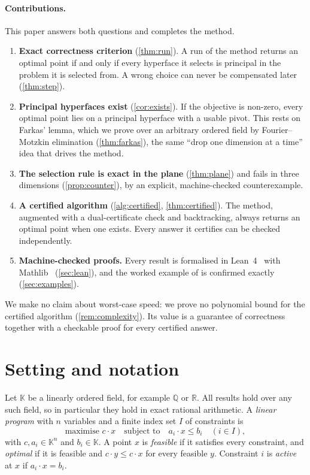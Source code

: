 \documentclass[11pt,a4paper]{article}
\theoremstyle{plain}
\theoremstyle{definition}
\theoremstyle{remark}
\newcommand{\R}{\mathbb{R}}
\newcommand{\K}{\mathbb{K}}
\begin{document}
\paragraph{Contributions.} This paper answers both questions and completes the method.
\begin{enumerate}[label=(\arabic*)]
  \item \textbf{Exact correctness criterion} (\cref{thm:run}). A run of the method returns an
  optimal point if and only if every hyperface it selects is principal in the problem it is
  selected from. A wrong choice can never be compensated later (\cref{thm:step}).
  \item \textbf{Principal hyperfaces exist} (\cref{cor:exists}). If the objective is non-zero,
  every optimal point lies on a principal hyperface with a usable pivot. This rests on Farkas'
  lemma, which we prove over an arbitrary ordered field by Fourier--Motzkin elimination
  (\cref{thm:farkas}), the same ``drop one dimension at a time'' idea that drives the method.
  \item \textbf{The selection rule is exact in the plane} (\cref{thm:plane}) and fails in three
  dimensions (\cref{prop:counter}), by an explicit, machine-checked counterexample.
  \item \textbf{A certified algorithm} (\cref{alg:certified}, \cref{thm:certified}). The
  method, augmented with a dual-certificate check and backtracking, always returns an optimal
  point when one exists. Every answer it certifies can be checked independently.
  \item \textbf{Machine-checked proofs.} Every result is formalised in Lean~4~\cite{lean4}
  with Mathlib~\cite{mathlib2020} (\cref{sec:lean}), and the worked example of
  \cite{grishin2008} is confirmed exactly (\cref{sec:examples}).
\end{enumerate}

We make no claim about worst-case speed: we prove no polynomial bound for the certified
algorithm (\cref{rem:complexity}). Its value is a guarantee of correctness together with a
checkable proof for every certified answer.

\section{Setting and notation}\label{sec:setting}

Let $\K$ be a linearly ordered field, for example $\mathbb{Q}$ or $\R$. All results hold over
any such field, so in particular they hold in exact rational arithmetic. A \emph{linear program}
with $n$ variables and a finite index set $I$ of constraints is
\begin{equation}\label{eq:lp}
  \text{maximise } c\cdot x \quad\text{subject to}\quad a_i\cdot x\le b_i \quad (i\in I),
\end{equation}
with $c, a_i\in\K^n$ and $b_i\in\K$. A point $x$ is \emph{feasible} if it satisfies every
constraint, and \emph{optimal} if it is feasible and $c\cdot y\le c\cdot x$ for every feasible
$y$. Constraint $i$ is \emph{active} at $x$ if $a_i\cdot x=b_i$.
\end{document}
